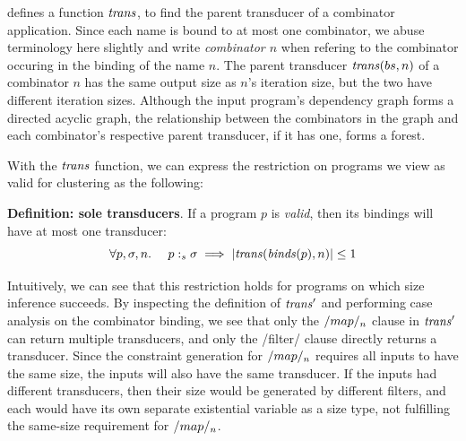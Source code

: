  defines a function $\mathit{trans}$, to find the parent transducer of a combinator application.
Since each name is bound to at most one combinator, we abuse terminology here slightly and write \emph{combinator $n$} when refering to the combinator occuring in the binding of the name $n$.
The parent transducer $\mathit{trans}(bs, n)$ of a combinator $n$ has the same output size as $n$'s iteration size, but the two have different iteration sizes.
Although the input program's dependency graph forms a directed acyclic graph, the relationship between the combinators in the graph and each combinator's respective parent transducer, if it has one, forms a forest.

With the $\mathit{trans}$ function, we can express the restriction on programs we view as valid for clustering as the following:

\textbf{Definition: sole transducers}.
If a program $p$ is \emph{valid}, then its bindings will have at most one transducer:
\[
\forall p, \sigma, n.\ \ \ \ p :_s \sigma \implies |\mathit{trans}(\mathit{binds}(p), n)| \le 1
\]

Intuitively, we can see that this restriction holds for programs on which size inference succeeds.
By inspecting the definition of $\mathit{trans}'$ and performing case analysis on the combinator binding, we see that only the $\Hs/map/_n$ clause in $\mathit{trans}'$ can return multiple transducers, and only the \Hs/filter/ clause directly returns a transducer.
Since the constraint generation for $\Hs/map/_n$ requires all inputs to have the same size, the inputs will also have the same transducer.
If the inputs had different transducers, then their size would be generated by different filters, and each would have its own separate existential variable as a size type, not fulfilling the same-size requirement for $\Hs/map/_n$.


 
% 

